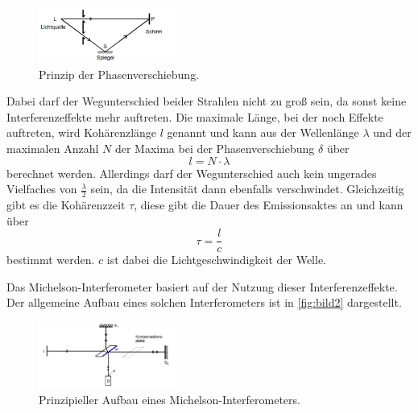 \begin{figure}
    \centering
    \includegraphics[width=0.4\textwidth]{images/bild1.png}
    \caption{Prinzip der Phasenverschiebung.\cite{V401}}
    \label{fig:bild1}
\end{figure}

Dabei darf der Wegunterschied beider Strahlen nicht zu groß sein, da sonst keine Interferenzeffekte mehr auftreten. Die maximale Länge, bei der noch Effekte auftreten, wird Kohärenzlänge $l$ genannt und kann aus der Wellenlänge $\lambda$ und der maximalen Anzahl $N$ der Maxima bei der Phasenverschiebung $\delta$ über 
\begin{equation}
    l = N \cdot \lambda
\end{equation}
berechnet werden.
Allerdings darf der Wegunterschied auch kein ungerades Vielfaches von $\frac{\lambda}{2}$ sein, da die Intensität dann ebenfalls verschwindet.
Gleichzeitig gibt es die Kohärenzzeit $\tau$, diese gibt die Dauer des Emissionsaktes an und kann über 
\begin{equation}
    \tau = \frac{l}{c}
\end{equation}
bestimmt werden. $c$ ist dabei die Lichtgeschwindigkeit der Welle.

Das Michelson-Interferometer basiert auf der Nutzung dieser Interferenzeffekte.
Der allgemeine Aufbau eines solchen Interferometers ist in \autoref{fig:bild2} dargestellt.

\begin{figure}
    \centering
    \includegraphics[width=0.4\textwidth]{images/bild2.png}
    \caption{Prinzipieller Aufbau eines Michelson-Interferometers.\cite{V401}}
    \label{fig:bild2}
\end{figure}

